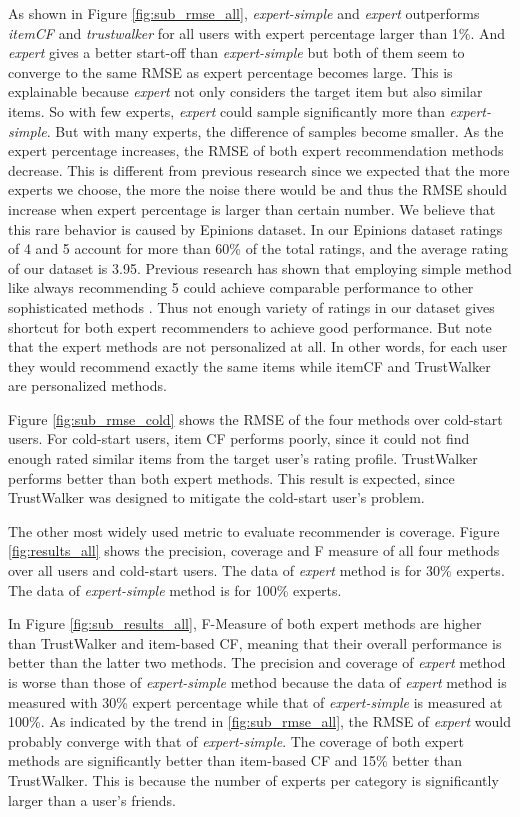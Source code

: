\documentclass[12pt]{article}
\begin{document}
As shown in Figure \ref{fig:sub_rmse_all}, \emph{expert-simple} and \emph{expert} outperforms \emph{itemCF} and \emph{trustwalker} for all users with expert percentage larger than 1\%. And \emph{expert} gives a better start-off than \emph{expert-simple} but both of them seem to converge to the same RMSE as expert percentage becomes large. This is explainable because \emph{expert} not only considers the target item but also similar items. So with few experts, \emph{expert} could sample significantly more than \emph{expert-simple}. But with many experts, the difference of samples become smaller. As the expert percentage increases, the RMSE of both expert recommendation methods decrease. This is different from previous research \cite{Sarwar:2001p433} since we expected that the more experts we choose, the more the noise there would be and thus the RMSE should increase when expert percentage is larger than certain number. We believe that this rare behavior is caused by Epinions dataset. In our Epinions dataset ratings of 4 and 5 account for more than 60\% of the total ratings, and the average rating of our dataset is 3.95. Previous research has shown that employing simple method like always recommending 5 could achieve comparable performance to other sophisticated methods \cite{Massa:2007p437}. Thus not enough variety of ratings in our dataset gives shortcut for both expert recommenders to achieve good performance. But note that the expert methods are not personalized at all. In other words, for each user they would recommend exactly the same items while itemCF and TrustWalker are personalized methods.


Figure \ref{fig:sub_rmse_cold} shows the RMSE of the four methods over cold-start users. For cold-start users, item CF performs poorly, since it could not find enough rated similar items from the target user's rating profile. TrustWalker performs better than both expert methods. This result is expected, since TrustWalker was designed to mitigate the cold-start user's problem.


The other most widely used metric to evaluate recommender is coverage. Figure \ref{fig:results_all} shows the precision, coverage and F measure of all four methods over all users and cold-start users. The data of \emph{expert} method is for 30\% experts. The data of \emph{expert-simple} method is for 100\% experts.

In Figure \ref{fig:sub_results_all}, F-Measure of both expert methods are higher than TrustWalker and item-based CF, meaning that their overall performance is better than the latter two methods. The precision and coverage of \emph{expert} method is worse than those of \emph{expert-simple} method because the data of \emph{expert} method is measured with 30\% expert percentage while that of \emph{expert-simple} is measured at 100\%. As indicated by the trend in \ref{fig:sub_rmse_all}, the RMSE of \emph{expert} would probably converge with that of \emph{expert-simple}. The coverage of both expert methods are significantly better than item-based CF and 15\% better than TrustWalker. This is because the number of experts per category is significantly larger than a user's friends.
\end{document}
